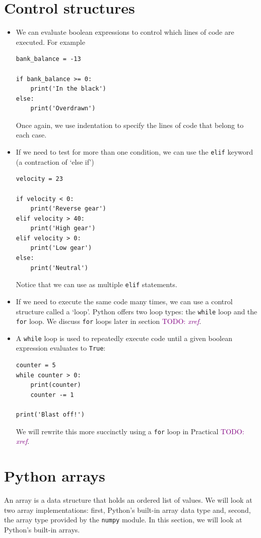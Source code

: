 \documentclass[a4paper,twoside]{memoir}
\newcommand{\shellcmd}{\texttt}
\newcommand{\TODO}[1]{\textcolor{purple}{TODO: \emph{#1}}}
\begin{document}
\section{Control structures}
\begin{itemize}
	\item We can evaluate boolean expressions to control which lines of code are executed.  For example
\begin{verbatim}
bank_balance = -13

if bank_balance >= 0:
	print('In the black')
else:
	print('Overdrawn')
\end{verbatim}
Once again, we use indentation to specify the lines of code that belong to each case.
	\item If we need to test for more than one condition, we can use the \shellcmd{elif} keyword (a contraction of `else if')
\begin{verbatim}
velocity = 23

if velocity < 0:
	print('Reverse gear')
elif velocity > 40:
	print('High gear')
elif velocity > 0:
	print('Low gear')
else:
	print('Neutral')
\end{verbatim}
Notice that we can use as multiple \shellcmd{elif} statements.
	\item If we need to execute the same code many times, we can use a control structure called a `loop'.  Python offers two loop types: the \shellcmd{while} loop and the \shellcmd{for} loop.  We discuss \shellcmd{for} loops later in section \TODO{xref}.
	\item A \shellcmd{while} loop is used to repeatedly execute code until a given boolean expression evaluates to \shellcmd{True}:
\begin{verbatim}
counter = 5
while counter > 0:
	print(counter)
	counter -= 1

print('Blast off!')
\end{verbatim}
\label{blast-off}
We will rewrite this more succinctly using a \shellcmd{for} loop in Practical \TODO{xref}.
\end{itemize}

\section{Python arrays}
An array is a data structure that holds an ordered list of values.  We will look at two array implementations: first, Python's built-in array data type and, second, the array type provided by the \shellcmd{numpy} module.  In this section, we will look at Python's built-in arrays.
\end{document}
